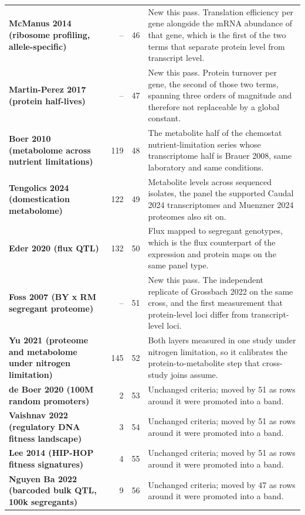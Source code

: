 \begin{longtable}{@{}L{46mm} r@{\hspace{6pt}} r@{\hspace{6pt}} L{104mm}@{}}
\addlinespace[5pt]
\textbf{McManus 2014 (ribosome profiling, allele-specific)} & -- & 46 & New this pass. Translation efficiency per gene alongside the mRNA abundance of that gene, which is the first of the two terms that separate protein level from transcript level. \\
\addlinespace[5pt]
\textbf{Martin-Perez 2017 (protein half-lives)} & -- & 47 & New this pass. Protein turnover per gene, the second of those two terms, spanning three orders of magnitude and therefore not replaceable by a global constant. \\
\addlinespace[5pt]
\textbf{Boer 2010 (metabolome across nutrient limitations)} & 119 & 48 & The metabolite half of the chemostat nutrient-limitation series whose transcriptome half is Brauer 2008, same laboratory and same conditions. \\
\addlinespace[5pt]
\textbf{Tengolics 2024 (domestication metabolome)} & 122 & 49 & Metabolite levels across sequenced isolates, the panel the supported Caudal 2024 transcriptomes and Muenzner 2024 proteomes also sit on. \\
\addlinespace[5pt]
\textbf{Eder 2020 (flux QTL)} & 132 & 50 & Flux mapped to segregant genotypes, which is the flux counterpart of the expression and protein maps on the same panel type. \\
\addlinespace[5pt]
\textbf{Foss 2007 (BY x RM segregant proteome)} & -- & 51 & New this pass. The independent replicate of Grossbach 2022 on the same cross, and the first measurement that protein-level loci differ from transcript-level loci. \\
\addlinespace[5pt]
\textbf{Yu 2021 (proteome and metabolome under nitrogen limitation)} & 145 & 52 & Both layers measured in one study under nitrogen limitation, so it calibrates the protein-to-metabolite step that cross-study joins assume. \\
\addlinespace[5pt]
\textbf{de Boer 2020 (100M random promoters)} & 2 & 53 & Unchanged criteria; moved by 51 as rows around it were promoted into a band. \\
\addlinespace[5pt]
\textbf{Vaishnav 2022 (regulatory DNA fitness landscape)} & 3 & 54 & Unchanged criteria; moved by 51 as rows around it were promoted into a band. \\
\addlinespace[5pt]
\textbf{Lee 2014 (HIP-HOP fitness signatures)} & 4 & 55 & Unchanged criteria; moved by 51 as rows around it were promoted into a band. \\
\addlinespace[5pt]
\textbf{Nguyen Ba 2022 (barcoded bulk QTL, 100k segregants)} & 9 & 56 & Unchanged criteria; moved by 47 as rows around it were promoted into a band. \\

\end{longtable}
